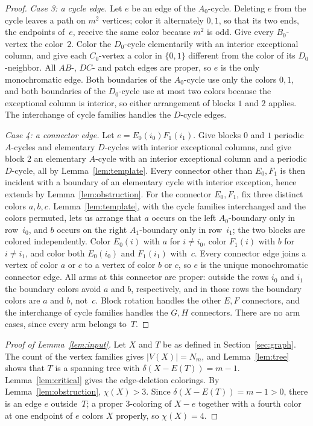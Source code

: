 \documentclass[11pt,letterpaper]{article}
\numberwithin{equation}{section}
\theoremstyle{plain}
\theoremstyle{definition}
\theoremstyle{remark}
\newcommand{\N}[1]{N_{#1}}
\begin{document}
\begin{proof}
\emph{Case 3: a cycle edge.}
Let $e$ be an edge of the $A_0$-cycle. Deleting $e$ from the cycle leaves a path on $m^2$ vertices; color it alternately $0,1$, so that its two ends, the endpoints of~$e$, receive the same color because $m^2$ is odd. Give every $B_0$-vertex the color~$2$. Color the $D_0$-cycle elementarily with an interior exceptional column, and give each $C_0$-vertex a color in $\{0,1\}$ different from the color of its $D_0$-neighbor. All $AB$-, $DC$- and patch edges are proper, so $e$ is the only monochromatic edge. Both boundaries of the $A_0$-cycle use only the colors $0,1$, and both boundaries of the $D_0$-cycle use at most two colors because the exceptional column is interior, so either arrangement of blocks $1$ and $2$ applies. The interchange of cycle families handles the $D$-cycle edges.

\emph{Case 4: a connector edge.}
Let $e=E_0(i_0)F_1(i_1)$. Give blocks $0$ and $1$ periodic $A$-cycles and elementary $D$-cycles with interior exceptional columns, and give block $2$ an elementary $A$-cycle with an interior exceptional column and a periodic $D$-cycle, all by Lemma~\ref{lem:template}. Every connector other than $E_0,F_1$ is then incident with a boundary of an elementary cycle with interior exception, hence extends by Lemma~\ref{lem:obstruction}. For the connector $E_0,F_1$, fix three distinct colors $a,b,c$. Lemma~\ref{lem:template}, with the cycle families interchanged and the colors permuted, lets us arrange that $a$ occurs on the left $A_0$-boundary only in row~$i_0$, and $b$ occurs on the right $A_1$-boundary only in row~$i_1$; the two blocks are colored independently. Color $E_0(i)$ with $a$ for $i\ne i_0$, color $F_1(i)$ with $b$ for $i\ne i_1$, and color both $E_0(i_0)$ and $F_1(i_1)$ with~$c$. Every connector edge joins a vertex of color $a$ or $c$ to a vertex of color $b$ or $c$, so $e$ is the unique monochromatic connector edge. All arms at this connector are proper: outside the rows $i_0$ and $i_1$ the boundary colors avoid $a$ and $b$, respectively, and in those rows the boundary colors are $a$ and $b$, not~$c$. Block rotation handles the other $E,F$ connectors, and the interchange of cycle families handles the $G,H$ connectors. There are no arm cases, since every arm belongs to~$T$.
\end{proof}

\begin{proof}[Proof of Lemma~\ref{lem:input}]
Let $X$ and $T$ be as defined in Section~\ref{sec:graph}. The count of the vertex families gives $|V(X)|=\N{m}$, and Lemma~\ref{lem:tree} shows that $T$ is a spanning tree with $\delta(X-E(T))=m-1$. Lemma~\ref{lem:critical} gives the edge-deletion colorings. By Lemma~\ref{lem:obstruction}, $\chi(X)>3$. Since $\delta(X-E(T))=m-1>0$, there is an edge $e$ outside~$T$; a proper $3$-coloring of $X-e$ together with a fourth color at one endpoint of $e$ colors $X$ properly, so $\chi(X)=4$.
\end{proof}
\end{document}
